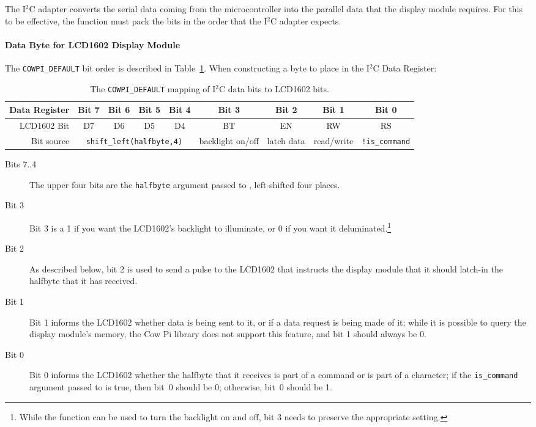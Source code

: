 The I$^2$C adapter\cite{i2cAdapter} converts the serial data coming from the microcontroller into the parallel data that the display module requires.
For this to be effective, the  function must pack the bits in the order that the I$^2$C adapter expects.

\paragraph{Data Byte for LCD1602 Display Module}


The \lstinline{COWPI_DEFAULT} bit order is described in Table~\ref{tab:LCD1602bits}.
When constructing a byte to place in the I$^2$C Data Register:

\begin{table}
    \centering \footnotesize
    \begin{tabular}{|r||c|c|c|c|c|c|c|c|} \hline
        Data Register   & Bit 7 & Bit 6 & Bit 5 & Bit 4 & Bit 3 & Bit 2 & Bit 1 & Bit 0 \\ \hline
        LCD1602 Bit     & D7    & D6    & D5    & D4    & BT    & EN    & RW    & RS    \\ \hline
        Bit source      & \multicolumn{4}{|c|}{\lstinline{shift_left(halfbyte,4)}} & backlight on/off & latch data & read/write & \texttt{!is\_command} \\ \hline %
    \end{tabular}
    \caption{The \lstinline{COWPI_DEFAULT} mapping of I$^2$C data bits to LCD1602 bits. \label{tab:LCD1602bits}}
\end{table}

\begin{description}
    \item[Bits 7..4] The upper four bits are the \lstinline{halfbyte} argument passed to , left-shifted four places.
    \item[Bit 3] Bit 3 is a 1 if you want the LCD1602's backlight to illuminate, or 0 if you want it deluminated.\footnote{
        While the  function can be used to turn the backlight on and off, bit 3 needs to preserve the appropriate setting.}
    \item[Bit 2] As described below, bit 2 is used to send a pulse to the LCD1602 that instructs the display module that it should latch-in the halfbyte that it has received.
    \item[Bit 1] Bit 1 informs the LCD1602 whether data is being sent to it, or if a data request is being made of it;
        while it is possible to query the display module's memory, the Cow Pi library does not support this feature, and bit 1 should always be 0.
    \item[Bit 0] Bit 0 informs the LCD1602 whether the halfbyte that it receives is part of a command or is part of a character;
        if the \lstinline{is_command} argument passed to  is true, then bit~0 should be 0; otherwise, bit~0 should be 1.
\end{description}

